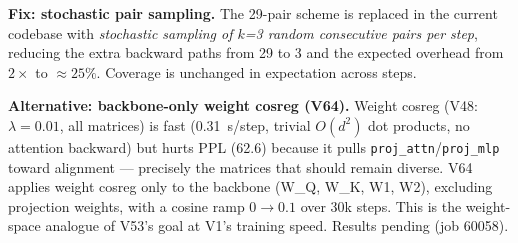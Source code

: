 \textbf{Fix: stochastic pair sampling.}
The 29-pair scheme is replaced in the current codebase with \emph{stochastic
sampling of $k$=3 random consecutive pairs per step}, reducing the extra backward
paths from 29 to 3 and the expected overhead from $2{\times}$ to ${\approx}25\%$.
Coverage is unchanged in expectation across steps.

\textbf{Alternative: backbone-only weight cosreg (V64).}
Weight cosreg (V48: $\lambda{=}0.01$, all matrices) is fast (0.31~s/step, trivial
$O(d^2)$ dot products, no attention backward) but hurts PPL (62.6) because it
pulls \texttt{proj\_attn}/\texttt{proj\_mlp} toward alignment — precisely the matrices
that should remain diverse.
V64 applies weight cosreg only to the backbone (W\_Q, W\_K, W1, W2), excluding
projection weights, with a cosine ramp $0{\to}0.1$ over 30k steps.
This is the weight-space analogue of V53's goal at V1's training speed.
Results pending (job 60058).


